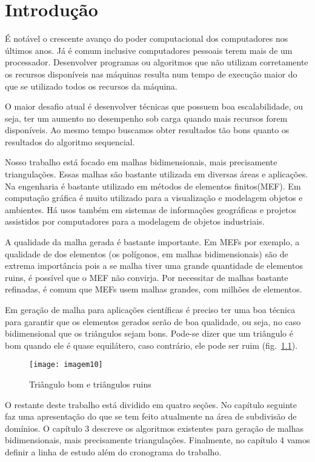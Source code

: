 \cleardoublepage
\pagestyle{fancy}

\chapter{Introdução}\label{intro}
É notável o crescente avanço do poder computacional dos computadores nos últimos anos. Já é comum inclusive computadores pessoais terem mais de um processador. Desenvolver programas ou algoritmos que não utilizam corretamente os recursos disponíveis nas máquinas resulta num tempo de execução maior do que se utilizado todos os recursos da máquina.

O maior desafio atual é desenvolver técnicas que possuem boa escalabilidade, ou seja, ter um aumento no desempenho sob carga quando mais recursos forem disponíveis. Ao mesmo tempo buscamos obter resultados tão bons quanto os resultados do algoritmo sequencial.

Nosso trabalho está focado em malhas bidimensionais, mais precisamente triangulações. Essas malhas são bastante utilizada em diversas áreas e aplicações. Na engenharia é bastante utilizado em métodos de elementos finitos(MEF). Em computação gráfica é muito utilizado para a visualização e modelagem objetos e ambientes. Há usos também em  sistemas de informações geográficas e projetos assistidos por computadores para a modelagem de objetos industriais.

A qualidade da malha gerada é bastante importante. Em MEFs por exemplo, a qualidade de dos elementos (os polígonos, em malhas bidimensionais) são de extrema importância pois a se malha tiver uma grande quantidade de elementos ruins, é possível que o MEF não convirja. Por necessitar de malhas bastante refinadas, é comum que MEFs usem malhas grandes, com milhões de elementos.

Em geração de malha para aplicações científicas é preciso ter uma boa técnica para garantir que os elementos gerados serão de boa qualidade, ou seja, no caso bidimensional que os triângulos sejam bons. Pode-se dizer que um triângulo é bom quando ele é quase equilátero, caso contrário, ele pode ser ruim (fig.~\ref{fig:imagem10}).

 \begin{figure}[htbp]
     \centering
     \texttt{[image: imagem10]}
     \caption{Triângulo bom e triângulos ruins} 
     \label{fig:imagem10}
 \end{figure}

O restante deste trabalho está dividido em quatro seções. No capítulo seguinte faz uma apresentação do que se tem feito atualmente na área de subdivisão de domínios. O capítulo 3 descreve os algoritmos existentes para geração de malhas bidimensionais, mais precisamente triangulações. Finalmente, no capítulo 4 vamos definir a linha de estudo além do cronograma do trabalho.

